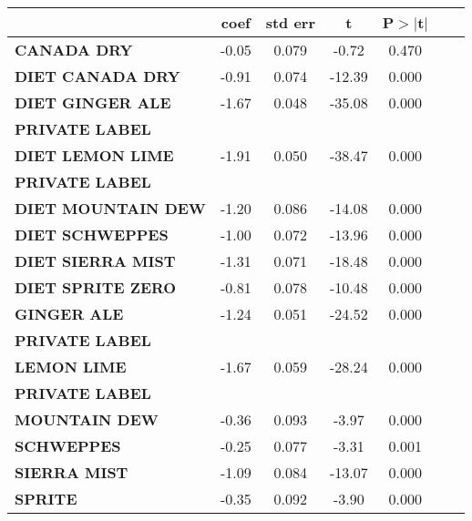 
\begin{tabular}{lcccccc}
                                           & \textbf{coef} & \textbf{std err} & \textbf{t} & \textbf{P$>$$|$t$|$} \\
\midrule
\textbf{CANADA DRY}                    &      -0.05  &        0.079     &    -0.72  &         0.470               \\
\textbf{DIET CANADA DRY}               &      -0.91  &        0.074     &   -12.39  &         0.000               \\
\textbf{DIET GINGER ALE} &      -1.67  &        0.048     &   -35.08  &         0.000               \\
\textbf{PRIVATE LABEL} \\
\textbf{DIET LEMON LIME} &      -1.91  &        0.050     &   -38.47  &         0.000               \\
\textbf{PRIVATE LABEL} \\
\textbf{DIET MOUNTAIN DEW}             &      -1.20  &        0.086     &   -14.08  &         0.000               \\
\textbf{DIET SCHWEPPES}                &      -1.00  &        0.072     &   -13.96  &         0.000               \\
\textbf{DIET SIERRA MIST}              &      -1.31  &        0.071     &   -18.48  &         0.000               \\
\textbf{DIET SPRITE ZERO}              &      -0.81  &        0.078     &   -10.48  &         0.000               \\
\textbf{GINGER ALE}      &      -1.24  &        0.051     &   -24.52  &         0.000               \\
\textbf{PRIVATE LABEL} \\
\textbf{LEMON LIME}      &      -1.67  &        0.059     &   -28.24  &         0.000               \\
\textbf{PRIVATE LABEL} \\
\textbf{MOUNTAIN DEW}                  &      -0.36  &        0.093     &    -3.97  &         0.000               \\
\textbf{SCHWEPPES}                     &      -0.25  &        0.077     &    -3.31  &         0.001               \\
\textbf{SIERRA MIST}                   &      -1.09  &        0.084     &   -13.07  &         0.000               \\
\textbf{SPRITE}                        &      -0.35  &        0.092     &    -3.90  &         0.000               \\

\end{tabular}
